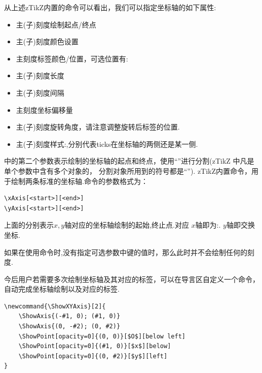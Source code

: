 从上述zTikZ内置的\cmd{\xAxis}\index{\cmd{\xAxis}}命令可以看出，我们可以指定坐标轴的如下属性:
\begin{itemize}
    \item 主(子)刻度绘制起点/终点
    \item 主(子)刻度颜色设置
    \item 主刻度标签颜色/位置，可选位置有:
    \item 主(子)刻度长度
    \item 主(子)刻度间隔
    \item 主刻度坐标偏移量
    \item 主(子)刻度旋转角度，请注意调整旋转后标签的位置.
    \item 主(子)刻度样式:,分别代表ticks在坐标轴的两侧还是某一侧.
\end{itemize}

\cmd{\ShowAxis}中的第二个参数表示绘制的坐标轴的起点和终点，使用``\cmd{;}''进行分割(zTikZ 中凡是单个参数中含有多个对象的，
分割对象所用到的符号都是``\cmd{;}''). zTikZ内置\cmd{\xAxis,\yAxis}\index{\cmd{\yAxis}}命令，用于绘制两条标准的坐标轴.命令的参数格式为：
\begin{verbatim}
\xAxis[<start>][<end>]
\yAxis[<start>][<end>]
\end{verbatim}

上面的分别表示$x,y$轴对应的坐标轴绘制的起始,终止点.对应 $x$轴即为:.
$y$轴即交换坐标.

\begin{remark}
    如果在使用\cmd{\ShowAxis}命令时,没有指定可选参数中键的值时，那么此时并不会绘制任何的刻度.
\end{remark}

今后用户若需要多次绘制坐标轴及其对应的标签，可以在导言区自定义一个\cmd{\ShowXYAxis}命令，
自动完成坐标轴绘制以及对应的标签.
\newcommand{\ShowXYAxis}[2]{
    \ShowAxis{(-#1, 0); (#1, 0)}
    \ShowAxis{(0, -#2); (0, #2)}
    \ShowPoint[opacity=0]{(0, 0)}[$O$][below left]
    \ShowPoint[opacity=0]{(#1, 0)}[$x$][below]
    \ShowPoint[opacity=0]{(0, #2)}[$y$][left]
}

\begin{verbatim}
\newcommand{\ShowXYAxis}[2]{
    \ShowAxis{(-#1, 0); (#1, 0)}
    \ShowAxis{(0, -#2); (0, #2)}
    \ShowPoint[opacity=0]{(0, 0)}[$O$][below left]
    \ShowPoint[opacity=0]{(#1, 0)}[$x$][below]
    \ShowPoint[opacity=0]{(0, #2)}[$y$][left]
}
\end{verbatim}

